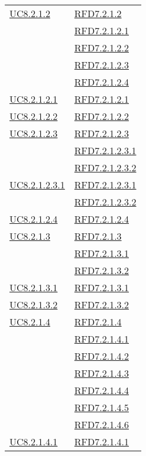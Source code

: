 \begin{longtable}{|>{\centering}m{5cm}|m{5cm}<{\centering}|}
\hyperref[UC8.2.1.2]{UC8.2.1.2} & \hyperlink{RFD7.2.1.2}{RFD7.2.1.2}\\
& \hyperlink{RFD7.2.1.2.1}{RFD7.2.1.2.1}\\
& \hyperlink{RFD7.2.1.2.2}{RFD7.2.1.2.2}\\
& \hyperlink{RFD7.2.1.2.3}{RFD7.2.1.2.3}\\
& \hyperlink{RFD7.2.1.2.4}{RFD7.2.1.2.4}\\ \hline
\hyperref[UC8.2.1.2.1]{UC8.2.1.2.1} & \hyperlink{RFD7.2.1.2.1}{RFD7.2.1.2.1}\\ \hline
\hyperref[UC8.2.1.2.2]{UC8.2.1.2.2} & \hyperlink{RFD7.2.1.2.2}{RFD7.2.1.2.2}\\ \hline
\hyperref[UC8.2.1.2.3]{UC8.2.1.2.3} & \hyperlink{RFD7.2.1.2.3}{RFD7.2.1.2.3}\\
& \hyperlink{RFD7.2.1.2.3.1}{RFD7.2.1.2.3.1}\\
& \hyperlink{RFD7.2.1.2.3.2}{RFD7.2.1.2.3.2}\\ \hline
\hyperref[UC8.2.1.2.3.1]{UC8.2.1.2.3.1} & \hyperlink{RFD7.2.1.2.3.1}{RFD7.2.1.2.3.1}\\
& \hyperlink{RFD7.2.1.2.3.2}{RFD7.2.1.2.3.2}\\ \hline
\hyperref[UC8.2.1.2.4]{UC8.2.1.2.4} & \hyperlink{RFD7.2.1.2.4}{RFD7.2.1.2.4}\\ \hline
\hyperref[UC8.2.1.3]{UC8.2.1.3} & \hyperlink{RFD7.2.1.3}{RFD7.2.1.3}\\
& \hyperlink{RFD7.2.1.3.1}{RFD7.2.1.3.1}\\
& \hyperlink{RFD7.2.1.3.2}{RFD7.2.1.3.2}\\ \hline
\hyperref[UC8.2.1.3.1]{UC8.2.1.3.1} & \hyperlink{RFD7.2.1.3.1}{RFD7.2.1.3.1}\\ \hline
\hyperref[UC8.2.1.3.2]{UC8.2.1.3.2} & \hyperlink{RFD7.2.1.3.2}{RFD7.2.1.3.2}\\ \hline
\hyperref[UC8.2.1.4]{UC8.2.1.4} & \hyperlink{RFD7.2.1.4}{RFD7.2.1.4}\\
& \hyperlink{RFD7.2.1.4.1}{RFD7.2.1.4.1}\\
& \hyperlink{RFD7.2.1.4.2}{RFD7.2.1.4.2}\\
& \hyperlink{RFD7.2.1.4.3}{RFD7.2.1.4.3}\\
& \hyperlink{RFD7.2.1.4.4}{RFD7.2.1.4.4}\\
& \hyperlink{RFD7.2.1.4.5}{RFD7.2.1.4.5}\\
& \hyperlink{RFD7.2.1.4.6}{RFD7.2.1.4.6}\\ \hline
\hyperref[UC8.2.1.4.1]{UC8.2.1.4.1} & \hyperlink{RFD7.2.1.4.1}{RFD7.2.1.4.1}\\

\end{longtable}
